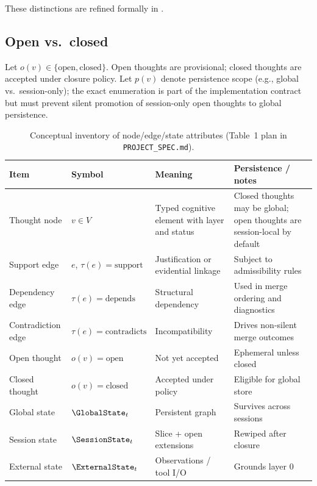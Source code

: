 These distinctions are refined formally in .

\subsection{Open vs.\ closed}
Let $o(v)\in\{\text{open},\text{closed}\}$.
Open thoughts are provisional; closed thoughts are accepted under closure policy.
Let $p(v)$ denote persistence scope (e.g., global vs.\ session-only); the exact enumeration is part of the implementation contract but must prevent silent promotion of session-only open thoughts to global persistence.

\begin{table}[t]
  \centering
  \small
  \caption{Conceptual inventory of node/edge/state attributes (Table~1 plan in \texttt{PROJECT\_SPEC.md}).}
  \label{tab:ontology}
  \begin{tabular}{@{}p{2.6cm}p{1.6cm}p{4.2cm}p{3.6cm}@{}}
    \toprule
    Item & Symbol & Meaning & Persistence / notes \\
    \midrule
    Thought node & $v\in V$ & Typed cognitive element with layer and status & Closed thoughts may be global; open thoughts are session-local by default \\
    Support edge & $e$, $\tau(e)=\text{support}$ & Justification or evidential linkage & Subject to admissibility rules \\
    Dependency edge & $\tau(e)=\text{depends}$ & Structural dependency & Used in merge ordering and diagnostics \\
    Contradiction edge & $\tau(e)=\text{contradicts}$ & Incompatibility & Drives non-silent merge outcomes \\
    Open thought & $o(v)=\text{open}$ & Not yet accepted & Ephemeral unless closed \\
    Closed thought & $o(v)=\text{closed}$ & Accepted under policy & Eligible for global store \\
    Global state & $\GlobalState_t$ & Persistent graph & Survives across sessions \\
    Session state & $\SessionState_t$ & Slice + open extensions & Rewiped after closure \\
    External state & $\ExternalState_t$ & Observations / tool I/O & Grounds layer $0$ \\
    \bottomrule
  \end{tabular}
\end{table}
